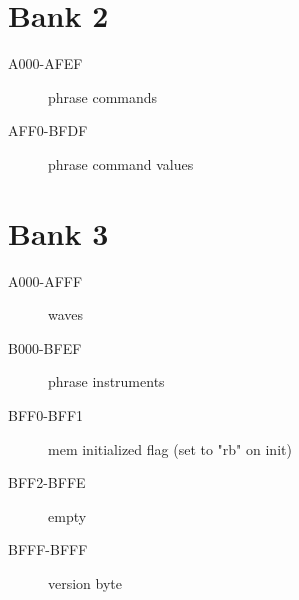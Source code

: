 \section{Bank 2}

\begin{description}
    \item[A000-AFEF] phrase commands
    \item[AFF0-BFDF] phrase command values
\end{description}

\section{Bank 3}

\begin{description}
    \item[A000-AFFF] waves
    \item[B000-BFEF] phrase instruments
    \item[BFF0-BFF1] mem initialized flag (set to "rb" on init)
    \item[BFF2-BFFE] empty
    \item[BFFF-BFFF] version byte
\end{description}
